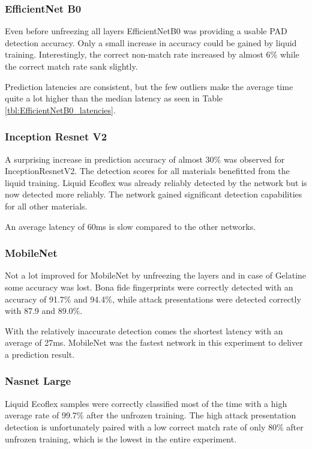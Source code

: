 \subsubsection{EfficientNet B0}
Even before unfreezing all layers EfficientNetB0 was providing a usable PAD detection accuracy.
Only a small increase in accuracy could be gained by liquid training.
Interestingly, the correct non-match rate increased by almost 6\% while the correct match rate sank slightly.

Prediction latencies are consistent, but the few outliers make the average time quite a lot higher than the median latency as seen in Table \ref{tbl:EfficientNetB0_latencies}.



\vspace{-1cm}
\subsubsection{Inception Resnet V2}
A surprising increase in prediction accuracy of almost 30\% was observed for InceptionResnetV2.
The detection scores for all materials benefitted from the liquid training.
Liquid Ecoflex was already reliably detected by the network but is now detected more reliably.
The network gained significant detection capabilities for all other materials.

An average latency of 60ms is slow compared to the other networks.


\vspace{-1cm}
\subsubsection{MobileNet}
Not a lot improved for MobileNet by unfreezing the layers and in case of Gelatine some accuracy was lost.
Bona fide fingerprints were correctly detected with an accuracy of 91.7\% and 94.4\%, while attack presentations were detected correctly with 87.9 and 89.0\%.

With the relatively inaccurate detection comes the shortest latency with an average of 27ms.
MobileNet was the fastest network in this experiment to deliver a prediction result.



\vspace{-1cm}
\subsubsection{Nasnet Large}
Liquid Ecoflex samples were correctly classified most of the time with a high average rate of 99.7\% after the unfrozen training.
The high attack presentation detection is unfortunately paired with a low correct match rate of only 80\% after unfrozen training, which is the lowest in the entire experiment.

